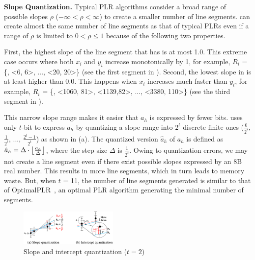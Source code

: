 \textbf{Slope Quantization.} 
Typical PLR algorithms consider a broad range of possible slopes $\rho$
($-\infty<\rho<\infty$) to create a smaller
number of line segments.  \ours{} can
create almost the same number of line segments as that of typical PLRs even if a range of $\rho$ is
limited to $0 < \rho \leq 1$ because of the following two properties.

First, the highest slope of the line segment that \ours{} has is at most 1.0.
This extreme case occurs where both $x_i$ and $y_i$ increase
monotonically by 1, for example, $R_i$ = \{<5, 5>, <6, 6>, ...,
<20, 20>\} (see the first segment in ). Second, the lowest
slope in \ours{} is at least higher than 0.0. This happens when $x_i$ increases
much faster than $y_i$, for example, $R_i$ = \{<980, 80>, <1060, 81>, <1139,82>,
..., <3380, 110>\} (see the third segment in ).

This narrow slope range makes it easier that $a_h$ is expressed by
fewer bits.  \ours{} uses only $t$-bit to express $a_h$ by
quantizing a slope range into $2^t$
discrete finite ones ($\frac{0}{2^t}$, $\frac{1}{2^t}$, ...,
$\frac{2^t-1}{2^t}$) as shown in (a). 
The quantized version $\hat a_h$ of $a_h$
is defined as $\hat a_h = \Delta \cdot \floor*{\frac{a_h}{\Delta}}$, 
where the step size $\Delta$ is $\frac{1}{2^t}$.
Owing to quantization errors,
we may not create a line segment even if there exist possible
slopes expressed by an 8B real number.
This results in more
line segments, which in turn leads to memory waste.  
But, when $t$ = 11, the number of line
segments generated is similar to that of 
OptimalPLR~\cite{plr3}, an optimal PLR algorithm generating
the minimal number of segments.

\begin{figure}[t]
\centering
\includegraphics[width=0.43\textwidth]{figs/OSDI/PLR_opt_2.eps}
\caption{Slope and intercept quantization ($t=2$)}
\label{fig:plr_opt}
\end{figure}


